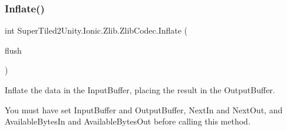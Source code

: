 \subsubsection{\texorpdfstring{Inflate()}{Inflate()}}
{\footnotesize\ttfamily int Super\+Tiled2\+Unity.\+Ionic.\+Zlib.\+Zlib\+Codec.\+Inflate (\begin{DoxyParamCaption}\item[{\mbox{\hyperlink{namespace_super_tiled2_unity_1_1_ionic_1_1_zlib_a2c5853fd63f03c83ac2458da1f4ff3bc}{Flush\+Type}}}]{flush }\end{DoxyParamCaption})}



Inflate the data in the Input\+Buffer, placing the result in the Output\+Buffer. 

You must have set Input\+Buffer and Output\+Buffer, Next\+In and Next\+Out, and Available\+Bytes\+In and Available\+Bytes\+Out before calling this method. 


